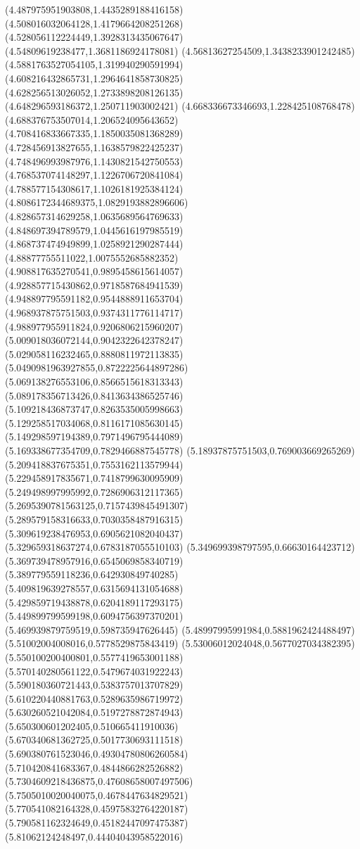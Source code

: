 {(4.487975951903808,1.4435289188416158)
(4.508016032064128,1.4179664208251268)
(4.528056112224449,1.3928313435067647)
(4.54809619238477,1.3681186924178081)
(4.56813627254509,1.3438233901242485)
(4.5881763527054105,1.319940290591994)
(4.608216432865731,1.2964641858730825)
(4.628256513026052,1.2733898208126135)
(4.648296593186372,1.250711903002421)
(4.668336673346693,1.228425108768478)
(4.688376753507014,1.206524095643652)
(4.708416833667335,1.1850035081368289)
(4.728456913827655,1.1638579822425237)
(4.748496993987976,1.1430821542750553)
(4.768537074148297,1.1226706720841084)
(4.788577154308617,1.1026181925384124)
(4.8086172344689375,1.0829193882896606)
(4.828657314629258,1.0635689564769633)
(4.848697394789579,1.0445616197985519)
(4.868737474949899,1.0258921290287444)
(4.88877755511022,1.0075552685882352)
(4.908817635270541,0.9895458615614057)
(4.928857715430862,0.9718587684941539)
(4.948897795591182,0.9544888911653704)
(4.968937875751503,0.9374311776114717)
(4.988977955911824,0.9206806215960207)
(5.009018036072144,0.9042322642378247)
(5.029058116232465,0.8880811972113835)
(5.0490981963927855,0.8722225644897286)
(5.069138276553106,0.8566515618313343)
(5.089178356713426,0.8413634386525746)
(5.109218436873747,0.8263535005998663)
(5.129258517034068,0.8116171085630145)
(5.149298597194389,0.7971496795444089)
(5.169338677354709,0.7829466887545778)
(5.18937875751503,0.769003669265269)
(5.209418837675351,0.7553162113579944)
(5.229458917835671,0.7418799630095909)
(5.249498997995992,0.7286906312117365)
(5.2695390781563125,0.7157439845491307)
(5.289579158316633,0.7030358487916315)
(5.309619238476953,0.6905621082040437)
(5.329659318637274,0.6783187055510103)
(5.349699398797595,0.66630164423712)
(5.369739478957916,0.6545069858340719)
(5.389779559118236,0.642930849740285)
(5.409819639278557,0.6315694131054688)
(5.429859719438878,0.6204189117293175)
(5.449899799599198,0.6094756397370201)
(5.469939879759519,0.598735947626445)
(5.48997995991984,0.5881962424488497)
(5.51002004008016,0.5778529875843419)
(5.53006012024048,0.5677027034382395)
(5.550100200400801,0.5577419653001188)
(5.570140280561122,0.5479674031922243)
(5.590180360721443,0.5383757013707829)
(5.610220440881763,0.5289635986719972)
(5.630260521042084,0.5197278872874943)
(5.650300601202405,0.510665411910036)
(5.670340681362725,0.5017730693111518)
(5.690380761523046,0.49304780806260584)
(5.710420841683367,0.4844866282526882)
(5.7304609218436875,0.47608658007497506)
(5.7505010020040075,0.4678447634829521)
(5.770541082164328,0.45975832764220187)
(5.790581162324649,0.45182447097475387)
(5.81062124248497,0.44404043958522016)
}
